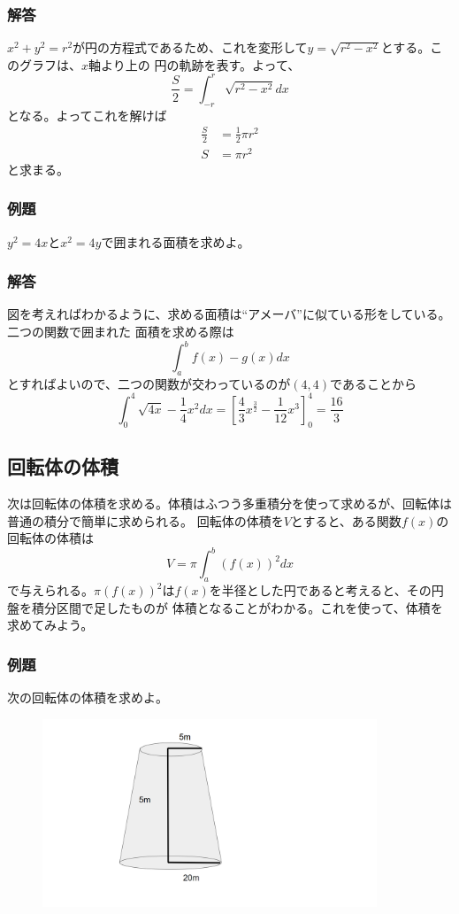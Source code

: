\documentclass[a4j,dvipdfmx]{jsarticle}
\begin{document}
\subsubsection*{解答}
$x^2+y^2=r^2$が円の方程式であるため、これを変形して$y=\sqrt{r^2-x^2}$とする。このグラフは、$x$軸より上の
円の軌跡を表す。よって、
\begin{equation*}
    \frac{S}{2}=\int_{-r}^{r}\sqrt{r^2-x^2}dx
\end{equation*}
となる。よってこれを解けば
\begin{align*}
    \frac{S}{2}&=\frac{1}{2}\pi r^2\\
    S&=\pi r^2
\end{align*}
と求まる。
\subsubsection*{例題}
$y^2=4x$と$x^2=4y$で囲まれる面積を求めよ。
\subsubsection*{解答}
図を考えればわかるように、求める面積は``アメーバ''に似ている形をしている。二つの関数で囲まれた
面積を求める際は
\begin{equation*}
    \int_a^b f(x)-g(x)dx
\end{equation*}
とすればよいので、二つの関数が交わっているのが$(4,4)$であることから
\begin{equation*}
    \int_{0}^{4} \sqrt{4x}-\frac{1}{4}x^2dx=\left[\frac{4}{3}x^{\frac{3}{2}}-\frac{1}{12}x^3\right]_0^4=\frac{16}{3}
\end{equation*}
\newpage
\subsection{回転体の体積}
次は回転体の体積を求める。体積はふつう多重積分を使って求めるが、回転体は普通の積分で簡単に求められる。
回転体の体積を$V$とすると、ある関数$f(x)$の回転体の体積は
\begin{equation*}
    V=\pi\int_a^b(f(x))^2dx
\end{equation*}
で与えられる。$\pi(f(x))^2$は$f(x)$を半径とした円であると考えると、その円盤を積分区間で足したものが
体積となることがわかる。これを使って、体積を求めてみよう。
\subsubsection*{例題}
次の回転体の体積を求めよ。
\begin{figure}[h]
    \centering
    \includegraphics[width=10cm,scale=5]{img/回転体.png}
\end{figure}
\end{document}
